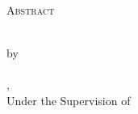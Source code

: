 
\begin{center}
	\textsc{\large Abstract}
	\vspace{1cm}
	\begin{singlespace}
		\textsc{\large \ThesisTitle} \\
		\vspace{1cm}
		by \\
		\ThesisAuthor \\
		\vspace{1cm}
		\UniversityName, \ThesisYear \\
		Under the Supervision of \ThesisAdvisor
	\end{singlespace}
\end{center}

\vspace{0.5cm}

\begin{doublespace}
	\begin{flushleft}
		\blindtext
	\end{flushleft}
\end{doublespace}

\clearpage
